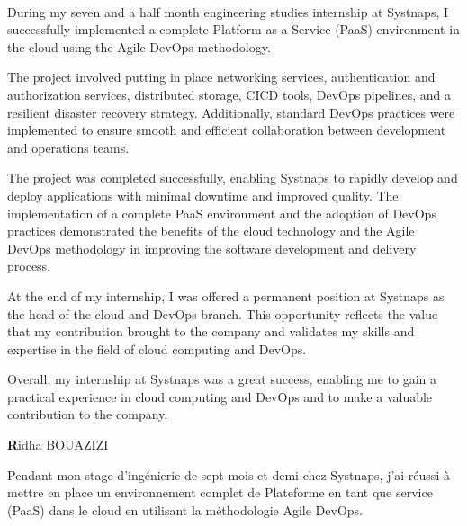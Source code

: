\thispagestyle{empty}
\thispagestyle{empty}

\\
\vspace{2cm}
\begin{center}

\end{center}
\vspace{0.8cm}
During my seven and a half month engineering studies internship at Systnaps, I successfully implemented a complete Platform-as-a-Service (PaaS) environment in the cloud using the Agile DevOps methodology. 

The project involved putting in place networking services, authentication and authorization services, distributed storage, CICD tools, DevOps pipelines, and a resilient disaster recovery strategy. Additionally, standard DevOps practices were implemented to ensure smooth and efficient collaboration between development and operations teams. 

The project was completed successfully, enabling Systnaps to rapidly develop and deploy applications with minimal downtime and improved quality. The implementation of a complete PaaS environment and the adoption of DevOps practices demonstrated the benefits of the cloud technology and the Agile DevOps methodology in improving the software development and delivery process. 

At the end of my internship, I was offered a permanent position at Systnaps as the head of the cloud and DevOps branch. This opportunity reflects the value that my contribution brought to the company and validates my skills and expertise in the field of cloud computing and DevOps. 

Overall, my internship at Systnaps was a great success, enabling me to gain a practical experience in cloud computing and DevOps and to make a valuable contribution to the company. 


\begin{flushright}
\textbf Ridha BOUAZIZI
\end{flushright}

\newpage
\thispagestyle{empty}
\begin{center}
\end{center}
\vspace{0.8cm}
Pendant mon stage d'ingénierie de sept mois et demi chez Systnaps, j'ai réussi à mettre en place un environnement complet de Plateforme en tant que service (PaaS) dans le cloud en utilisant la méthodologie Agile DevOps. 

